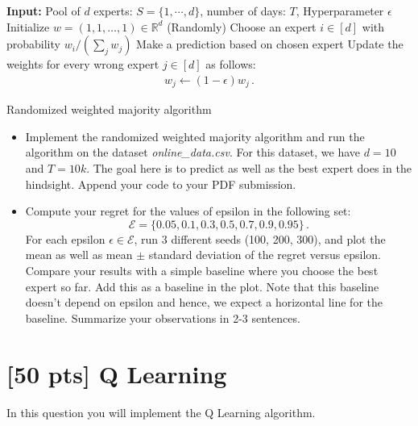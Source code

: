 \documentclass{article}
\begin{document}
\begin{algorithm}[H]
\begin{algorithmic}

\State \textbf{Input:} Pool of $d$ experts: $S=\{1,\cdots, d\}$, number of days: $T$, Hyperparameter $\epsilon$
\State Initialize $w = (1, 1, \ldots, 1) \in \mathbb{R}^d$ 
\vspace{2mm}
    \State (Randomly) Choose an expert $i \in [d]$ with probability $w_i/(\sum_j w_j)$ 
    \State Make a prediction based on chosen expert 
    \State Update the weights for every wrong expert $j \in [d]$ as follows: 
    \begin{align*} w_j \gets (1 - \epsilon) w_j \,. \end{align*}
\EndFor    
\caption{Randomized weighted majority algorithm}

\end{algorithmic}
\end{algorithm}
\vspace{3mm}

\begin{itemize}
	\item Implement the randomized weighted majority algorithm and run the algorithm on the dataset \emph{online\_data.csv}. For this dataset, we have $d =10$ and $T = 10k$. The goal here is to predict as well as the best expert does in the hindsight. Append your code to your PDF submission. \\
	\item Compute your regret for the values of epsilon in the following set: 
			$$\mathcal{E} = \{0.05, 0.1, 0.3, 0.5, 0.7, 0.9, 0.95\}\,.$$ 
			For each epsilon $\epsilon \in \mathcal{E}$, run 3 different seeds (100, 200, 300), and plot the mean  as well as mean $\pm$ standard deviation of the regret versus epsilon. Compare your results with a simple baseline where you choose the best expert so far. Add this as a baseline in the plot. Note that this baseline doesn't depend on epsilon and hence, we expect a horizontal line for the baseline.   Summarize your observations in 2-3 sentences. 

\end{itemize}


\newpage
\section{[50 pts] Q Learning}

In this question you will implement the Q Learning algorithm.
\end{document}
